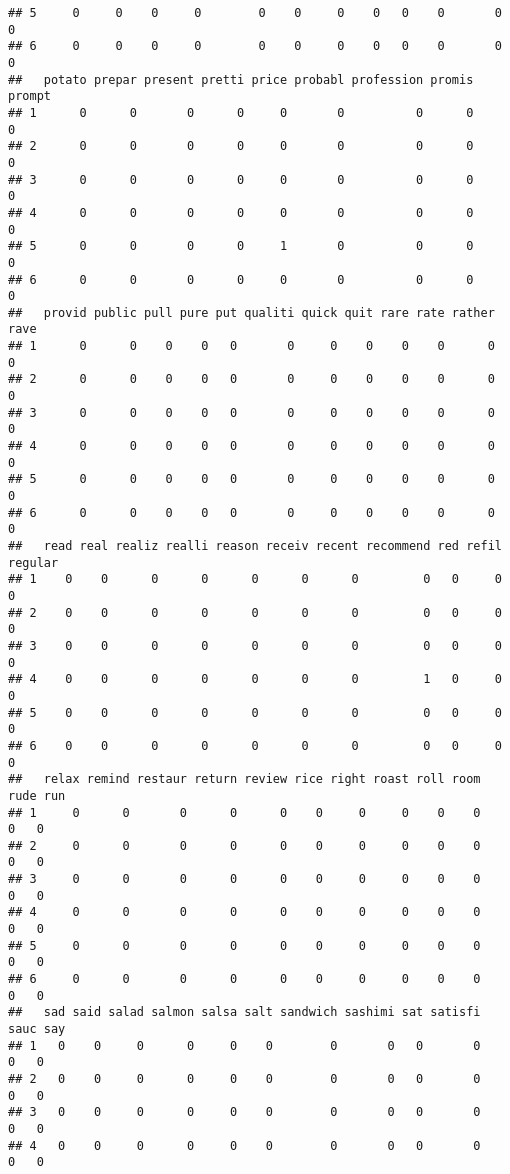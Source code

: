 \documentclass[]{article}
\begin{document}
\begin{verbatim}
## 5     0     0    0     0        0    0     0    0   0    0       0       0
## 6     0     0    0     0        0    0     0    0   0    0       0       0
##   potato prepar present pretti price probabl profession promis prompt
## 1      0      0       0      0     0       0          0      0      0
## 2      0      0       0      0     0       0          0      0      0
## 3      0      0       0      0     0       0          0      0      0
## 4      0      0       0      0     0       0          0      0      0
## 5      0      0       0      0     1       0          0      0      0
## 6      0      0       0      0     0       0          0      0      0
##   provid public pull pure put qualiti quick quit rare rate rather rave
## 1      0      0    0    0   0       0     0    0    0    0      0    0
## 2      0      0    0    0   0       0     0    0    0    0      0    0
## 3      0      0    0    0   0       0     0    0    0    0      0    0
## 4      0      0    0    0   0       0     0    0    0    0      0    0
## 5      0      0    0    0   0       0     0    0    0    0      0    0
## 6      0      0    0    0   0       0     0    0    0    0      0    0
##   read real realiz realli reason receiv recent recommend red refil regular
## 1    0    0      0      0      0      0      0         0   0     0       0
## 2    0    0      0      0      0      0      0         0   0     0       0
## 3    0    0      0      0      0      0      0         0   0     0       0
## 4    0    0      0      0      0      0      0         1   0     0       0
## 5    0    0      0      0      0      0      0         0   0     0       0
## 6    0    0      0      0      0      0      0         0   0     0       0
##   relax remind restaur return review rice right roast roll room rude run
## 1     0      0       0      0      0    0     0     0    0    0    0   0
## 2     0      0       0      0      0    0     0     0    0    0    0   0
## 3     0      0       0      0      0    0     0     0    0    0    0   0
## 4     0      0       0      0      0    0     0     0    0    0    0   0
## 5     0      0       0      0      0    0     0     0    0    0    0   0
## 6     0      0       0      0      0    0     0     0    0    0    0   0
##   sad said salad salmon salsa salt sandwich sashimi sat satisfi sauc say
## 1   0    0     0      0     0    0        0       0   0       0    0   0
## 2   0    0     0      0     0    0        0       0   0       0    0   0
## 3   0    0     0      0     0    0        0       0   0       0    0   0
## 4   0    0     0      0     0    0        0       0   0       0    0   0

\end{verbatim}
\end{document}
